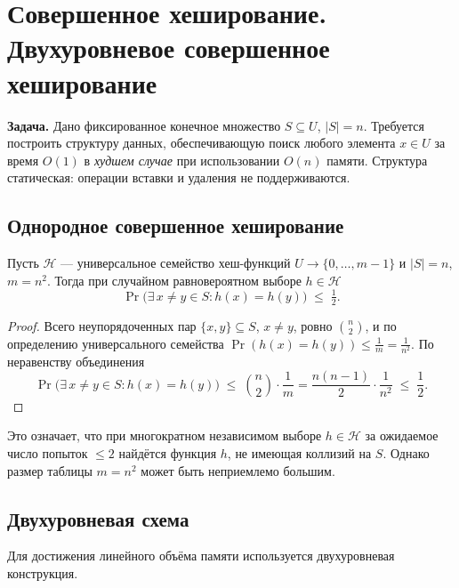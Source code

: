 
\section{Совершенное хеширование. Двухуровневое совершенное хеширование}

\textbf{Задача.} Дано фиксированное конечное множество $S \subseteq U$, $|S| = n$. Требуется построить структуру данных, обеспечивающую поиск любого элемента $x \in U$ за время $O(1)$ в \emph{худшем случае} при использовании $O(n)$ памяти. Структура статическая: операции вставки и удаления не поддерживаются.

\subsection{Однородное совершенное хеширование}

\begin{Lemma}{}{}
	Пусть $\mathcal{H}$ --- универсальное семейство хеш-функций $U \to \{0,\ldots,m-1\}$ и $|S|=n$, $m = n^2$. Тогда при случайном равновероятном выборе $h \in \mathcal{H}$
	\[
	\Pr\bigl(\exists\, x \neq y \in S : h(x) = h(y)\bigr) \;\leq\; \tfrac{1}{2}.
	\]
\end{Lemma}

\begin{proof}
	 Всего неупорядоченных пар $\{x,y\} \subseteq S$, $x \neq y$, ровно $\binom{n}{2}$, и по определению универсального семейства $\Pr(h(x)=h(y)) \leq \tfrac{1}{m} = \tfrac{1}{n^2}$. По неравенству объединения
	\[
	\Pr\bigl(\exists\, x \neq y \in S : h(x) = h(y)\bigr)
	\;\leq\; \binom{n}{2} \cdot \frac{1}{m}
	= \frac{n(n-1)}{2} \cdot \frac{1}{n^2}
	\;\leq\; \frac{1}{2}.
	\]
\end{proof}

\begin{Remark}{}{}
	Это означает, что при многократном независимом выборе $h \in \mathcal{H}$ за ожидаемое число попыток $\leq 2$ найдётся функция $h$, не имеющая коллизий на $S$. Однако размер таблицы $m = n^2$ может быть неприемлемо большим.
\end{Remark}

\subsection{Двухуровневая схема}

Для достижения линейного объёма памяти используется двухуровневая конструкция.

